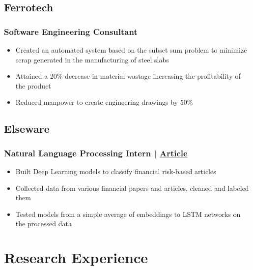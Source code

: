 \documentclass{article}
\begin{document}
\subsection{Ferrotech \null\hfill{}}

\subsubsection{Software Engineering Consultant}

\begin{itemize}[leftmargin=1em]


	\setlength\itemsep{-0.4em}

	\normalfont

	\item Created an automated system based on the subset sum problem to minimize scrap generated in the manufacturing of steel slabs
	\item Attained a 20\% decrease in material wastage increasing the profitability of the product
	\item Reduced manpower to create engineering drawings by 50\%

\end{itemize}

\subsection{Elseware  \null\hfill{}}
\subsubsection{Natural Language Processing Intern |  \href{https://www.linkedin.com/pulse/language-risk-patrick-naim/}{Article}}

\begin{itemize}[leftmargin=1em]


	\setlength\itemsep{-0.4em}

	\normalfont

	\item Built Deep Learning models to classify financial risk-based articles
	\item Collected data from various financial papers and articles, cleaned and labeled them
	\item Tested models from a simple average of embeddings to LSTM networks on the processed data
\end{itemize}

\section{Research Experience}
\end{document}
